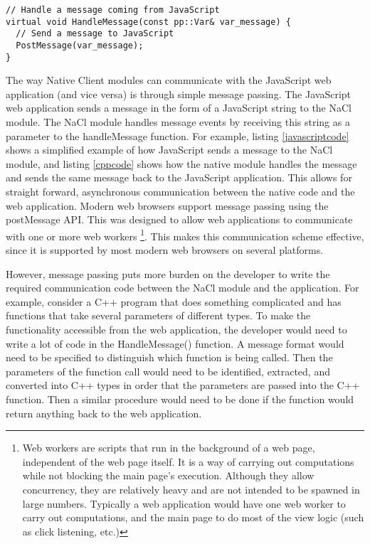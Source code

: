 \begin{lstlisting}
// Handle a message coming from JavaScript
virtual void HandleMessage(const pp::Var& var_message) {
  // Send a message to JavaScript
  PostMessage(var_message);
}
\end{lstlisting}

The way Native Client modules can communicate with the JavaScript web application (and vice versa) is through simple message passing. The JavaScript web application sends a message in the form of a JavaScript string to the NaCl module. The NaCl module handles message events by receiving this string as a parameter to the handleMessage function. For example, listing \ref{javascriptcode} shows a simplified example of how JavaScript sends a message to the NaCl module, and listing \ref{cppcode} shows how the native module handles the message and sends the same message back to the JavaScript application. This allows for straight forward, asynchronous communication between the native code and the web application. Modern web browsers support message passing using the postMessage API. This was designed to allow web applications to communicate with one or more web workers
\footnote{Web workers\cite{webworkersw3c} are scripts that run in the background of a web page, independent of the web page itself. It is a way of carrying out computations while not blocking the main page's execution. Although they allow concurrency, they are relatively heavy and are not intended to be spawned in large numbers. Typically a web application would have one web worker to carry out computations, and the main page to do most of the view logic (such as click listening, etc.)}. 
This makes this communication scheme effective, since it is supported by most modern web browsers on several platforms.

However, message passing puts more burden on the developer to write the required communication code between the NaCl module and the application. For example, consider a C++ program that does something complicated and has functions that take several parameters of different types. To make the functionality accessible from the web application, the developer would need to write a lot of code in the HandleMessage() function. A message format would need to be specified to distinguish which function is being called. Then the parameters of the function call would need to be identified, extracted, and converted into C++ types in order that the parameters are passed into the C++ function. Then a similar procedure would need to be done if the function would 
return anything back to the web application. 

